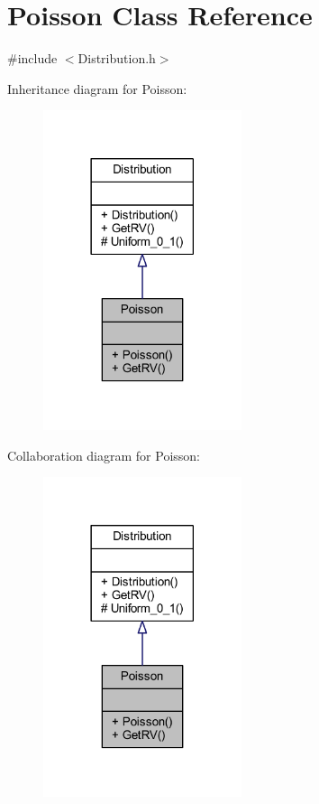 \hypertarget{class_poisson}{}\section{Poisson Class Reference}
\label{class_poisson}


{\ttfamily \#include $<$Distribution.\+h$>$}



Inheritance diagram for Poisson\+:
\nopagebreak
\begin{figure}[H]
\begin{center}
\leavevmode
\includegraphics[width=165pt]{class_poisson__inherit__graph}
\end{center}
\end{figure}


Collaboration diagram for Poisson\+:
\nopagebreak
\begin{figure}[H]
\begin{center}
\leavevmode
\includegraphics[width=165pt]{class_poisson__coll__graph}
\end{center}
\end{figure}
